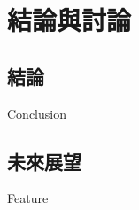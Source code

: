\renewcommand\thetable{\arabic{chapter}-\arabic{table}}
\chapter{結論與討論}
\label{cha:conclusions}


\section{結論}

Conclusion


\section{未來展望} 

Feature



